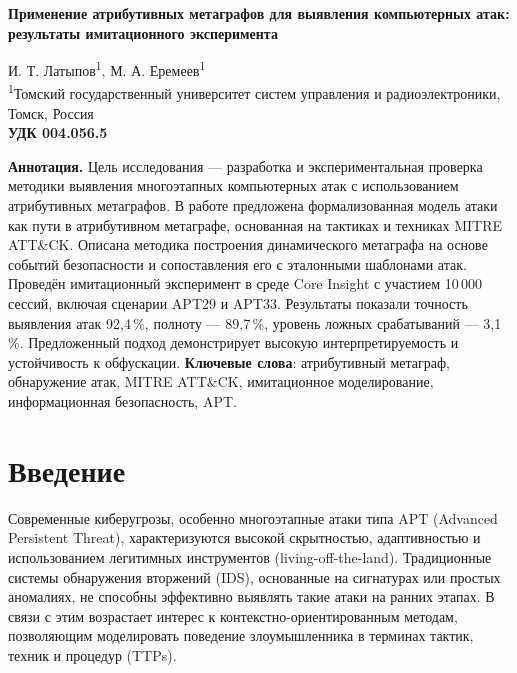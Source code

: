\documentclass[12pt,a4paper]{article}
\begin{document}
\begin{center}
\textbf{\LARGE Применение атрибутивных метаграфов для выявления компьютерных атак: результаты имитационного эксперимента}
\end{center}

\bigskip

\begin{center}
И. Т. Латыпов\textsuperscript{1}, М. А. Еремеев\textsuperscript{1} \\
\footnotesize
\textsuperscript{1}Томский государственный университет систем управления и радиоэлектроники, Томск, Россия \\
\vspace{0.3cm}
\textbf{УДК 004.056.5}
\end{center}

\bigskip

\noindent\textbf{Аннотация.}  
Цель исследования — разработка и экспериментальная проверка методики выявления многоэтапных компьютерных атак с использованием атрибутивных метаграфов. В работе предложена формализованная модель атаки как пути в атрибутивном метаграфе, основанная на тактиках и техниках MITRE ATT\&CK. Описана методика построения динамического метаграфа на основе событий безопасности и сопоставления его с эталонными шаблонами атак. Проведён имитационный эксперимент в среде Core Insight с участием 10\,000 сессий, включая сценарии APT29 и APT33. Результаты показали точность выявления атак 92,4\,\%, полноту — 89,7\,\%, уровень ложных срабатываний — 3,1\,\%. Предложенный подход демонстрирует высокую интерпретируемость и устойчивость к обфускации.  
\textbf{Ключевые слова}: атрибутивный метаграф, обнаружение атак, MITRE ATT\&CK, имитационное моделирование, информационная безопасность, APT.

\section{Введение}

Современные киберугрозы, особенно многоэтапные атаки типа APT (Advanced Persistent Threat), характеризуются высокой скрытностью, адаптивностью и использованием легитимных инструментов (living-off-the-land). Традиционные системы обнаружения вторжений (IDS), основанные на сигнатурах или простых аномалиях, не способны эффективно выявлять такие атаки на ранних этапах. В связи с этим возрастает интерес к контекстно-ориентированным методам, позволяющим моделировать поведение злоумышленника в терминах тактик, техник и процедур (TTPs).
\end{document}
